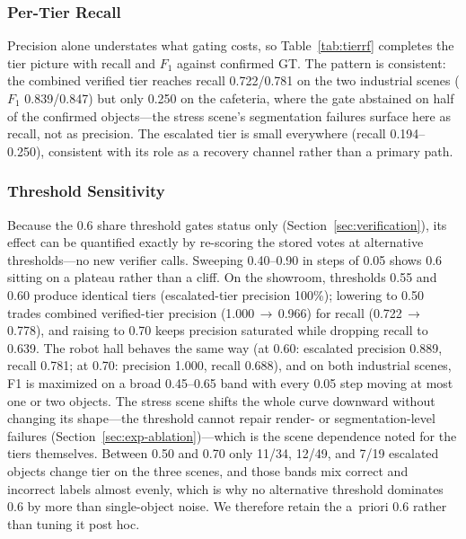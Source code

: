 \documentclass[electronics,article,accept,pdftex,moreauthors]{Definitions/mdpi}
\begin{document}
\subsubsection{Per-Tier Recall}
Precision alone understates what gating costs, so
Table~\ref{tab:tierrf} completes the tier picture with recall and $F_1$
against confirmed GT. The pattern is consistent: the combined verified
tier reaches recall 0.722/0.781 on the two industrial scenes
($F_1$ 0.839/0.847) but only 0.250 on the cafeteria, where the gate
abstained on half of the confirmed objects---the stress scene's
segmentation failures surface here as recall, not as precision. The
escalated tier is small everywhere (recall 0.194--0.250), consistent
with its role as a recovery channel rather than a primary path.


\subsubsection{Threshold Sensitivity}
Because the 0.6 share threshold gates status only
(Section~\ref{sec:verification}), its effect can be quantified exactly by
re-scoring the stored votes at alternative thresholds---no new verifier
calls. Sweeping 0.40--0.90 in steps of 0.05 shows 0.6 sitting on a
plateau rather than a cliff. On the showroom, thresholds 0.55 and 0.60
produce identical tiers (escalated-tier precision 100\%); lowering to
0.50 trades combined verified-tier precision (1.000\,$\rightarrow$\,0.966)
for recall (0.722\,$\rightarrow$\,0.778), and raising to 0.70 keeps
precision saturated while dropping recall to 0.639. The robot hall
behaves the same way (at 0.60: escalated precision 0.889, recall 0.781;
at 0.70: precision 1.000, recall 0.688), and on both industrial scenes,
F1 is maximized on a broad \mbox{0.45--0.65} band with every 0.05 step moving
at most one or two objects. The stress scene shifts the whole curve
downward without changing its shape---the threshold cannot repair
render- or segmentation-level failures
(Section~\ref{sec:exp-ablation})---which is the scene dependence noted for
the tiers themselves. Between 0.50 and 0.70 only 11/34, 12/49, and 7/19
escalated objects change tier on the three scenes, and those bands mix
correct and incorrect labels almost evenly, which is why no alternative
threshold dominates 0.6 by more than single-object noise. We therefore
retain the a~priori 0.6 rather than tuning it post hoc.
\end{document}
